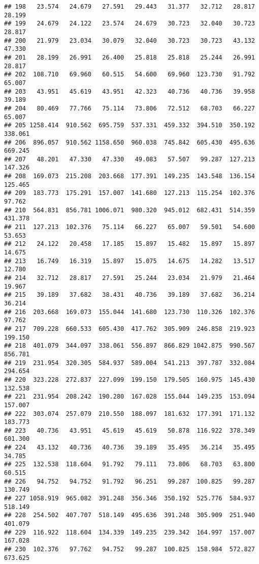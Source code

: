 \documentclass[
]{article}
\begin{document}
\begin{verbatim}
## 198   23.574   24.679   27.591   29.443   31.377   32.712   28.817   28.199
## 199   24.679   24.122   23.574   24.679   30.723   32.040   30.723   28.817
## 200   21.979   23.034   30.079   32.040   30.723   30.723   43.132   47.330
## 201   28.199   26.991   26.400   25.818   25.818   25.244   26.991   28.817
## 202  108.710   69.960   60.515   54.600   69.960  123.730   91.792   65.007
## 203   43.951   45.619   43.951   42.323   40.736   40.736   39.958   39.189
## 204   80.469   77.766   75.114   73.806   72.512   68.703   66.227   65.007
## 205 1258.414  910.562  695.759  537.331  459.332  394.510  350.192  338.061
## 206  896.057  910.562 1158.650  960.038  745.842  605.430  495.636  669.245
## 207   48.201   47.330   47.330   49.083   57.507   99.287  127.213  147.326
## 208  169.073  215.208  203.668  177.391  149.235  143.548  136.154  125.465
## 209  183.773  175.291  157.007  141.680  127.213  115.254  102.376   97.762
## 210  564.831  856.781 1006.071  980.320  945.012  682.431  514.359  431.378
## 211  127.213  102.376   75.114   66.227   65.007   59.501   54.600   53.653
## 212   24.122   20.458   17.185   15.897   15.482   15.897   15.897   14.675
## 213   16.749   16.319   15.897   15.075   14.675   14.282   13.517   12.780
## 214   32.712   28.817   27.591   25.244   23.034   21.979   21.464   19.967
## 215   39.189   37.682   38.431   40.736   39.189   37.682   36.214   36.214
## 216  203.668  169.073  155.044  141.680  123.730  110.326  102.376   97.762
## 217  709.228  660.533  605.430  417.762  305.909  246.858  219.923  199.150
## 218  401.079  344.097  338.061  556.897  866.829 1042.875  990.567  856.781
## 219  231.954  320.305  584.937  589.004  541.213  397.787  332.084  294.654
## 220  323.228  272.837  227.099  199.150  179.505  160.975  145.430  132.538
## 221  231.954  208.242  190.280  167.028  155.044  149.235  153.094  157.007
## 222  303.074  257.079  210.550  188.097  181.632  177.391  171.132  183.773
## 223   40.736   43.951   45.619   45.619   50.878  116.922  378.349  601.300
## 224   43.132   40.736   40.736   39.189   35.495   36.214   35.495   34.785
## 225  132.538  118.604   91.792   79.111   73.806   68.703   63.800   60.515
## 226   94.752   94.752   91.792   96.251   99.287  100.825   99.287  130.749
## 227 1058.919  965.082  391.248  356.346  350.192  525.776  584.937  518.149
## 228  254.502  407.707  518.149  495.636  391.248  305.909  251.940  401.079
## 229  116.922  118.604  134.339  149.235  239.342  164.997  157.007  167.028
## 230  102.376   97.762   94.752   99.287  100.825  158.984  572.827  673.625

\end{verbatim}
\end{document}
